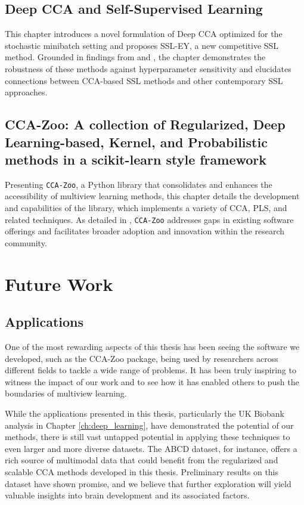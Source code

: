 \subsection{Deep CCA and Self-Supervised
Learning}
This chapter introduces a novel formulation of Deep CCA optimized for the stochastic minibatch setting and proposes SSL-EY, a new competitive SSL method. Grounded in findings from \citep{chapman2023cca} and \citep{chapman2023efficient}, the chapter demonstrates the robustness of these methods against hyperparameter sensitivity and elucidates connections between CCA-based SSL methods and other contemporary SSL approaches.

\subsection{CCA-Zoo: A collection of
Regularized, Deep
Learning-based, Kernel, and
Probabilistic methods in a
scikit-learn style framework}
Presenting \texttt{CCA-Zoo}, a Python library that consolidates and enhances the accessibility of multiview learning methods, this chapter details the development and capabilities of the library, which implements a variety of CCA, PLS, and related techniques. As detailed in \citep{chapman2021cca}, \texttt{CCA-Zoo} addresses gaps in existing software offerings and facilitates broader adoption and innovation within the research community.

\section{Future Work}

\subsection{Applications}

One of the most rewarding aspects of this thesis has been seeing the software we developed, such as the CCA-Zoo package, being used by researchers across different fields to tackle a wide range of problems. It has been truly inspiring to witness the impact of our work and to see how it has enabled others to push the boundaries of multiview learning.

While the applications presented in this thesis, particularly the UK Biobank analysis in Chapter \ref{ch:deep_learning}, have demonstrated the potential of our methods, there is still vast untapped potential in applying these techniques to even larger and more diverse datasets. The ABCD dataset, for instance, offers a rich source of multimodal data that could benefit from the regularized and scalable CCA methods developed in this thesis. Preliminary results on this dataset have shown promise, and we believe that further exploration will yield valuable insights into brain development and its associated factors.

